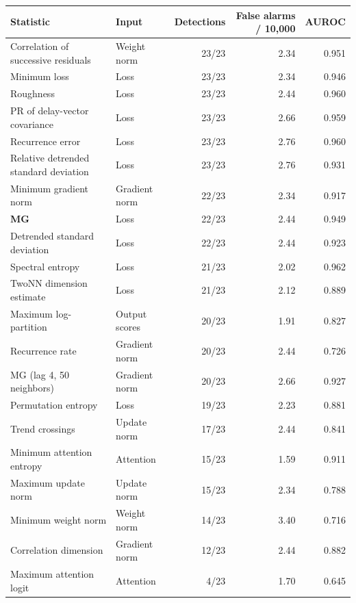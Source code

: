 \begin{tabular}{llrrr}
\toprule
Statistic & Input & Detections & False alarms / 10,000 & AUROC \\
\midrule
Correlation of successive residuals & Weight norm & 23/23 & 2.34 & 0.951 \\
Minimum loss & Loss & 23/23 & 2.34 & 0.946 \\
Roughness & Loss & 23/23 & 2.44 & 0.960 \\
PR of delay-vector covariance & Loss & 23/23 & 2.66 & 0.959 \\
Recurrence error & Loss & 23/23 & 2.76 & 0.960 \\
Relative detrended standard deviation & Loss & 23/23 & 2.76 & 0.931 \\
Minimum gradient norm & Gradient norm & 22/23 & 2.34 & 0.917 \\
\textbf{MG} & Loss & 22/23 & 2.44 & 0.949 \\
Detrended standard deviation & Loss & 22/23 & 2.44 & 0.923 \\
Spectral entropy & Loss & 21/23 & 2.02 & 0.962 \\
TwoNN dimension estimate & Loss & 21/23 & 2.12 & 0.889 \\
Maximum log-partition & Output scores & 20/23 & 1.91 & 0.827 \\
Recurrence rate & Gradient norm & 20/23 & 2.44 & 0.726 \\
MG (lag 4, 50 neighbors) & Gradient norm & 20/23 & 2.66 & 0.927 \\
Permutation entropy & Loss & 19/23 & 2.23 & 0.881 \\
Trend crossings & Update norm & 17/23 & 2.44 & 0.841 \\
Minimum attention entropy & Attention & 15/23 & 1.59 & 0.911 \\
Maximum update norm & Update norm & 15/23 & 2.34 & 0.788 \\
Minimum weight norm & Weight norm & 14/23 & 3.40 & 0.716 \\
Correlation dimension & Gradient norm & 12/23 & 2.44 & 0.882 \\
Maximum attention logit & Attention & 4/23 & 1.70 & 0.645 \\
\bottomrule
\end{tabular}

